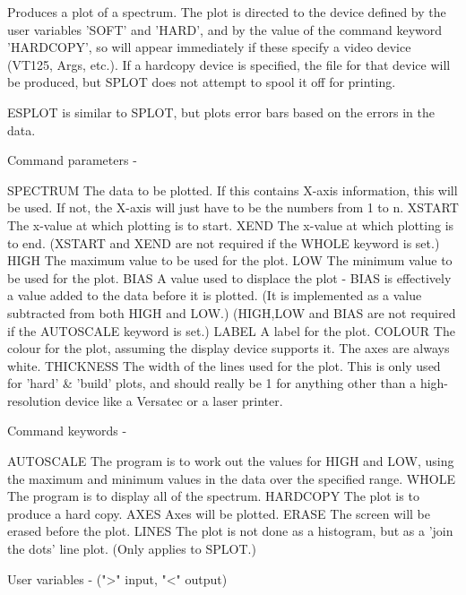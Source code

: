 \begin{description}
\begin{terminalv}
 Produces a plot of a spectrum.  The plot is directed
 to the device defined by the user variables 'SOFT' and
 'HARD', and by the value of the command keyword 'HARDCOPY',
 so will appear immediately if these specify a video
 device (VT125, Args, etc.).  If a hardcopy device
 is specified, the file for that device will be produced,
 but SPLOT does not attempt to spool it off for printing.

 ESPLOT is similar to SPLOT, but plots error bars based on the
 errors in the data.

 Command parameters -

 SPECTRUM    The data to be plotted.  If this contains X-axis
             information, this will be used.  If not, the X-axis
             will just have to be the numbers from 1 to n.
 XSTART      The x-value at which plotting is to start.
 XEND        The x-value at which plotting is to end.
             (XSTART and XEND are not required if the
             WHOLE keyword is set.)
 HIGH        The maximum value to be used for the plot.
 LOW         The minimum value to be used for the plot.
 BIAS        A value used to displace the plot - BIAS is
             effectively a value added to the data before
             it is plotted. (It is implemented as a value
             subtracted from both HIGH and LOW.)
             (HIGH,LOW and BIAS are not required if the
             AUTOSCALE keyword is set.)
 LABEL       A label for the plot.
 COLOUR      The colour for the plot, assuming the display device
             supports it.  The axes are always white.
 THICKNESS   The width of the lines used for the plot.  This is
             only used for 'hard' & 'build' plots, and should
             really be 1 for anything other than a high-resolution
             device like a Versatec or a laser printer.

 Command keywords -

 AUTOSCALE   The program is to work out the values for HIGH
             and LOW, using the maximum and minimum values
             in the data over the specified range.
 WHOLE       The program is to display all of the spectrum.
 HARDCOPY    The plot is to produce a hard copy.
 AXES        Axes will be plotted.
 ERASE       The screen will be erased before the plot.
 LINES       The plot is not done as a histogram, but as
             a 'join the dots' line plot.  (Only applies
             to SPLOT.)

 User variables -    (">" input, "<" output)


\end{terminalv}
\end{description}
